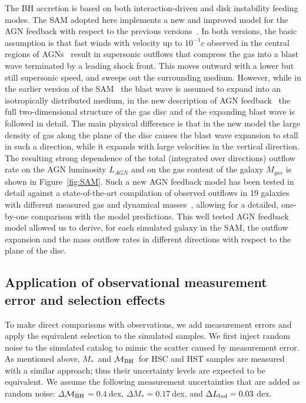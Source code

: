 \documentclass[twocolumn]{aastex631}
\def\smass{{$M_*$}}
\def\mbh{$\mathcal M_{\rm BH}$}
\begin{document}
The BH accretion is based on both interaction-driven and disk instability feeding modes.
The SAM adopted here implements a new and improved  model for the AGN feedback with respect to the previous versions~\citep{Menci2008}. In both versions, the basic assumption is that fast winds with velocity up to $10^{-1}c$ observed in the central regions of AGNs~\citep{Chartas2002, Pounds2003}  result in  supersonic outflows that compress the gas into a blast wave terminated by a leading shock front. This  moves outward with a lower but still supersonic speed, and sweeps out the surrounding medium. However, while in the earlier version of the SAM~\citep{Menci2016} the blast wave is assumed to expand into an isotropically distributed medium, in the new description of AGN feedback~\citep{Menci2019} the full two-dimensional structure of the gas disc and of the expanding blast wave is followed in detail. The main physical difference is that in the new model the large density of gas along the plane of the disc causes the blast wave expansion to stall in such a direction, while it expands with large velocities in the vertical direction. The resulting strong dependence of the total (integrated over directions) outflow rate on the AGN luminosity $L_{AGN}$ and on the gas content of the galaxy $M_{gas}$ is shown in Figure~\ref{fig:SAM}. Such a new AGN feedback model has been tested in detail against a state-of-the-art compilation of observed outflows in 19 galaxies with different measured gas and dynamical masses~\citep{Fiore2017}, allowing for a detailed, one-by-one comparison with the model predictions. This well tested AGN feedback model allowed us to derive, for each simulated galaxy in the SAM,  the outflow expansion and the mass outflow rates in different directions with respect to the plane of the disc.



\subsection{Application of observational measurement error and selection effects}
To make direct comparisons with observations, we add measurement errors and apply the equivalent selection to the simulated samples. We first inject random noise to the simulated catalog to mimic the scatter caused by measurement error. As mentioned above, \smass\ and \mbh\ for HSC and HST samples are measured with a similar approach; thus their uncertainty levels are expected to be equivalent. 
We assume the following measurement uncertainties that are added as random noise: $\Delta$\mbh$ = 0.4~$dex, $\Delta$\smass$ = 0.17~$dex, and $\Delta L_{\rm bol} = 0.03~$dex. 
\end{document}
